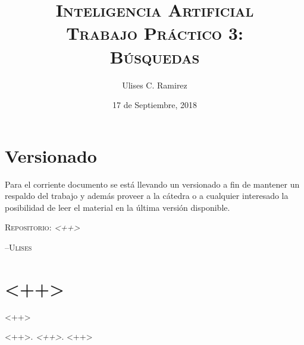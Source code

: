 \documentclass{article}
\title{\textsc{Inteligencia Artificial\\Trabajo Pr\'actico 3:\\B\'usquedas}}
\author{Ulises C. Ramirez}
\date{17 de Septiembre, 2018}
\begin{document}
\maketitle
{}
\newpage
\section*{Versionado}
Para el corriente documento se est\'a llevando un versionado a fin de mantener un respaldo del trabajo y adem\'as proveer a la c\'atedra o a cualquier interesado la posibilidad de leer el material en la \'ultima versi\'on disponible.\\

\begin{center}
  \textsc{Repositorio}: \textit{<++>}
\end{center}


\hfill--\textsc{Ulises}\tableofcontents
{}
\newpage

\section{<++>}
\label{sec:}
<++>

\begin{thebibliography}{99}
	\bibitem[<++>]{<++>}\textsc{<++>}. \textit{<++>}. <++>
\end{thebibliography}
\end{document}
